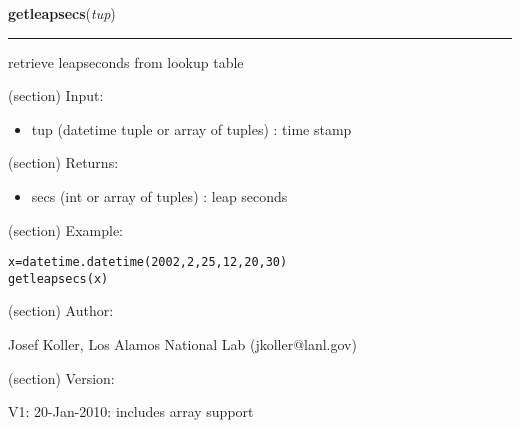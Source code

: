     \label{spacepy:ticktock:getleapsecs}

    \vspace{0.5ex}

\hspace{.8\funcindent}\begin{boxedminipage}{\funcwidth}

    \raggedright \textbf{getleapsecs}(\textit{tup})

    \vspace{-1.5ex}

    \rule{\textwidth}{0.5\fboxrule}
\setlength{\parskip}{2ex}
    retrieve leapseconds from lookup table

    (section) Input:

      \begin{itemize}
      \setlength{\parskip}{0.6ex}
        \item tup (datetime tuple or array of tuples) : time stamp

      \end{itemize}

    (section) Returns:

      \begin{itemize}
      \setlength{\parskip}{0.6ex}
        \item secs (int or array of tuples) : leap seconds

      \end{itemize}

    (section) Example:

\begin{alltt}
\pysrcprompt{{\textgreater}{\textgreater}{\textgreater} }x=datetime.datetime(2002,2,25,12,20,30)
\pysrcprompt{{\textgreater}{\textgreater}{\textgreater} }getleapsecs(x)
\end{alltt}
    (section) Author:

      Josef Koller, Los Alamos National Lab (jkoller@lanl.gov)

    (section) Version:

      V1: 20-Jan-2010: includes array support

\setlength{\parskip}{1ex}
    \end{boxedminipage}

    \label{spacepy:ticktock:doy2date}

